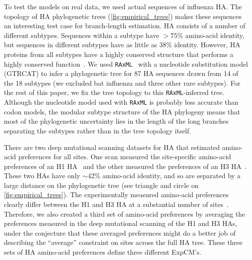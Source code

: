 \documentclass[11pt]{article}
\begin{document}
To test the models on real data, we used actual sequences of influenza HA. 
The topology of HA phylogenetic trees (\ref{fig:empirical_trees}) makes these sequences an interesting test case for branch-length estimation.
HA consists of a number of different subtypes.
Sequences within a subtype have $>75\%$ amino-acid identity, but sequences in different subtypes have as little as 38\% identity.
However, HA proteins from all subtypes have a highly conserved structure that performs a highly conserved function~\citep{ha2002h5,russell2004h1}.
We used \texttt{RAxML}~\citep{stamatakis2006raxml} with a nucleotide substitution model  (GTRCAT) to infer a phylogenetic tree for 87 HA sequences drawn from 14 of the 18 subtypes (we excluded bat influenza and three other rare subtypes).
For the rest of this paper, we fix the tree topology to this \texttt{RAxML}-inferred tree.
Although the nucleotide model used with \texttt{RAxML} is probably less accurate than codon models, the modular subtype structure of the HA phylogeny means that most of the phylogenetic uncertainty lies in the length of the long branches separating the subtypes rather than in the tree topology itself.

There are two deep mutational scanning datasets for HA that estimated amino-acid preferences for all sites.
One scan measured the site-specific amino-acid preferences of an H1 HA~\citep{doud2016accurate} and the other measured the preferences of an H3 HA~\citep{lee2018deep}.
These two HAs have only $\sim$42\% amino-acid identity, and so are separated by a large distance on the phylogenetic tree (see triangle and circle on \ref{fig:empirical_trees}).
The experimentally measured amino-acid preferences clearly differ between the H1 and H3 HA at a substantial number of sites~\citep[][\ref{suppfig:prefs_doud}, 
\ref{suppfig:prefs_lee}]{lee2018deep}.
Therefore, we also created a third set of amino-acid preferences by averaging the preferences measured in the deep mutational scanning of the H1 and H3 HAs, under the conjecture that these averaged preferences might do a better job of describing the ``average'' constraint on sites across the full HA tree.
These three sets of HA amino-acid preferences define three different ExpCM's.
 
\end{document}
